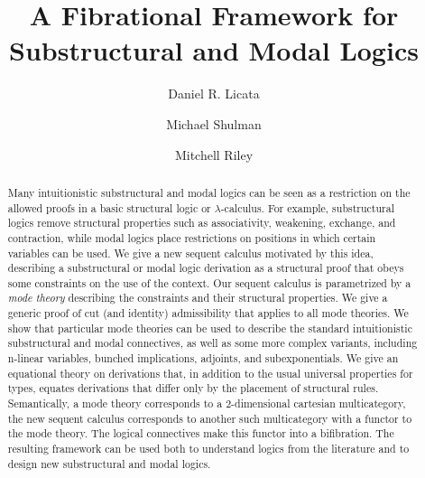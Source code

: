\documentclass{article}
\begin{document}
\title{A Fibrational Framework for \\ Substructural and Modal Logics}



\author[1]{{Daniel R. Licata}}
\author[2]{{Michael Shulman}}
\author[1]{{Mitchell Riley}}

\maketitle

\begin{abstract}
Many intuitionistic substructural and modal logics can be seen as a
restriction on the allowed proofs in a basic structural logic or
$\lambda$-calculus.  For example, substructural logics remove structural
properties such as associativity, weakening, exchange, and contraction,
while modal logics place restrictions on positions in which certain
variables can be used.  We give a new sequent calculus motivated by this
idea, describing a substructural or modal logic derivation as a
structural proof that obeys some constraints on the use of the context.
Our sequent calculus is parametrized by a \emph{mode theory} describing
the constraints and their structural properties.  We give a generic
proof of cut (and identity) admissibility that applies to all mode
theories.  We show that particular mode theories can be used to describe
the standard intuitionistic substructural and modal connectives, as well
as some more complex variants, including n-linear variables, bunched
implications, adjoints, and subexponentials.  We give an equational
theory on derivations that, in addition to the usual universal
properties for types, equates derivations that differ only by the
placement of structural rules.  Semantically, a mode theory corresponds
to a 2-dimensional cartesian multicategory, the new sequent calculus
corresponds to another such multicategory with a functor to the mode
theory. The logical connectives make this functor into a bifibration.
The resulting framework can be used both to understand logics from the
literature and to design new substructural and modal logics.
\end{abstract}










\setlength{\bibsep}{-1pt} %
{ \small
\linespread{0.70}


}
\end{document}
